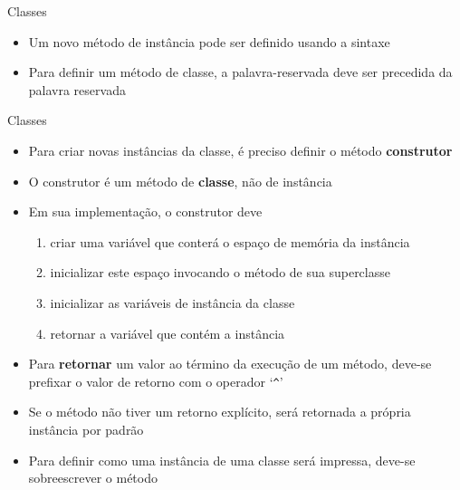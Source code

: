 \begin{frame}[fragile]{Classes}

    \begin{itemize}
        \item Um novo método de instância pode ser definido usando a  sintaxe


        \item Para definir um método de classe, a palavra-reservada  deve
            ser precedida da palavra reservada 

    \end{itemize}

\end{frame}
\begin{frame}[fragile]{Classes}

    \begin{itemize}
        \item Para criar novas instâncias da classe, é preciso definir o método \textbf{construtor}

        \item O construtor é um método de \textbf{classe}, não de instância

        \item Em sua implementação, o construtor deve
        \begin{enumerate}
            \item criar uma variável que conterá o espaço de memória da instância
            \item inicializar este espaço invocando o método  de sua
                superclasse
            \item inicializar as variáveis de instância da classe
            \item retornar a variável que contém a instância
        \end{enumerate}

        \item Para \textbf{retornar} um valor ao término da execução de um método, deve-se
            prefixar o valor de retorno com o operador `\texttt{\^{}}'

        \item Se o método não tiver um retorno explícito, será retornada a própria instância por
            padrão

        \item Para definir como uma instância de uma classe será impressa, deve-se sobreescrever
            o método 

    \end{itemize}

\end{frame}

